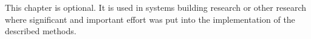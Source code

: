 This chapter is optional.
It is used in systems building research or other research
where significant and important effort was put into the
implementation of the described methods.
